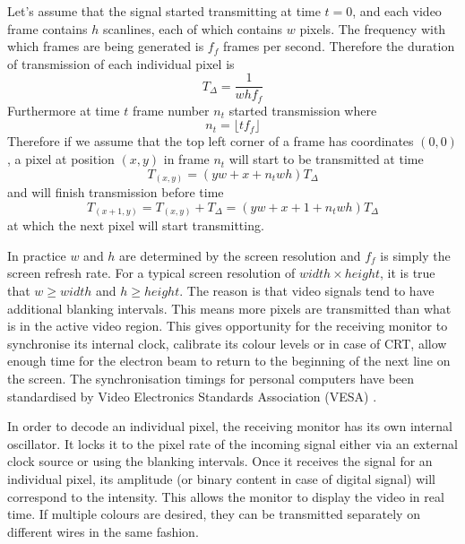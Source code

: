 \documentclass[a4paper,12pt,twoside,openright]{report}
\begin{document}
Let's assume that the signal started transmitting at time $t=0$, and each video frame contains $h$ scanlines, each of which contains $w$ pixels. The frequency with which frames are being generated is $f_{f}$ frames per second. Therefore the duration of transmission of each individual pixel is \begin{equation}
\label{eq:tdelta_definition}
T_{\Delta}=\frac{1}{w h f_{f}}
\end{equation}
Furthermore at time $t$ frame number $n_{t}$ started transmission where 
\begin{equation}
n_{t}=\lfloor t f_{f} \rfloor
\end{equation}
Therefore 
if we assume that the top left corner of a frame has coordinates $(0, 0)$, a pixel at position $(x, y)$ in frame $n_{t}$ will start to be transmitted at time
\begin{equation}
T_{(x,y)}= (y w + x + n_{t} w h) T_{\Delta}
\end{equation}
and will finish transmission before time 
\begin{equation}
T_{(x+1,y)} = T_{(x,y)} + T_{\Delta} =(y w + x + 1 + n_{t} w h) T_{\Delta}
\end{equation}
at which the next pixel will start transmitting.

In practice $w$ and $h$ are determined by the screen resolution and $f_{f}$ is simply the screen refresh rate. For a typical screen resolution of $width \times height$, it is true that $w \geq width$ and $h \geq height$. The reason is that video signals tend to have additional blanking intervals. This means more pixels are transmitted than what is in the active video region. This gives opportunity for the receiving monitor to synchronise its internal clock, calibrate its colour levels or in case of CRT, allow enough time for the electron beam to return to the beginning of the next line on the screen. The synchronisation timings for personal computers have been standardised by Video Electronics Standards Association (VESA) \cite{vesa}.

In order to decode an individual pixel, the receiving monitor has its own internal oscillator. It locks it to the pixel rate of the incoming signal either via an external clock source or using the blanking intervals. Once it receives the signal for an individual pixel, its amplitude (or binary content in case of digital signal) will correspond to the intensity. This allows the monitor to display the video in real time. If multiple colours are desired, they can be transmitted separately on different wires in the same fashion.
\end{document}
